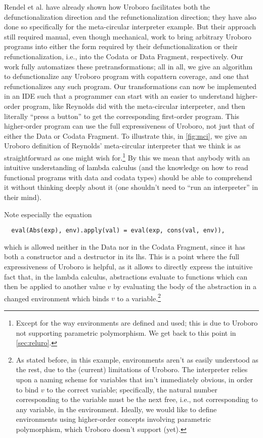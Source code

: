Rendel et al.\cite{rendel15automatic} have already shown how Uroboro facilitates both the defunctionalization direction and the refunctionalization direction; they have also done so specifically for the meta-circular interpreter example. But their approach still required manual, even though mechanical, work to bring arbitrary Uroboro programs into either the form required by their defunctionalization or their refunctionalization, i.e., into the Codata or Data Fragment, respectively. Our work fully automatizes these pretransformations; all in all, we give an algorithm to defunctionalize any Uroboro program with copattern coverage, and one that refunctionalizes any such program. Our transformations can now be implemented in an IDE such that a programmer can start with an easier to understand higher-order program, like Reynolds\cite{reynolds72definitional} did with the meta-circular interpreter, and then literally ``press a button'' to get the corresponding first-order program. This higher-order program can use the full expressiveness of Uroboro, not just that of either the Data or Codata Fragment. To illustrate this, in \autoref{fig:mci}, we give an Uroboro definition of Reynolds' meta-circular interpreter that we think is as straightforward as one might wish for.\footnote{Except for the way environments are defined and used; this is due to Uroboro not supporting parametric polymorphism. We get back to this point in \autoref{sec:reluro}.} By this we mean that anybody with an intuitive understanding of lambda calculus (and the knowledge on how to read functional programs with data and codata types) should be able to comprehend it without thinking deeply about it (one shouldn't need to ``run an interpreter'' in their mind).

Note especially the equation

\begin{lstlisting}
  eval(Abs(exp), env).apply(val) = eval(exp, cons(val, env)),
\end{lstlisting}

which is allowed neither in the Data nor in the Codata Fragment, since it has both a constructor and a destructor in its lhs. This is a point where the full expressiveness of Uroboro is helpful, as it allows to directly express the intuitive fact that, in the lambda calculus, abstractions evaluate to functions which can then be applied to another value $v$ by evaluating the body of the abstraction in a changed environment which binds $v$ to a variable.\footnote{As stated before, in this example, environments aren't as easily understood as the rest, due to the (current) limitations of Uroboro. The interpreter relies upon a naming scheme for variables that isn't immediately obvious, in order to bind $v$ to the correct variable; specifically, the natural number corresponding to the variable must be the next free, i.e., not corresponding to any variable, in the environment. Ideally, we would like to define environments using higher-order concepts involving parametric polymorphism, which Uroboro doesn't support (yet).}

